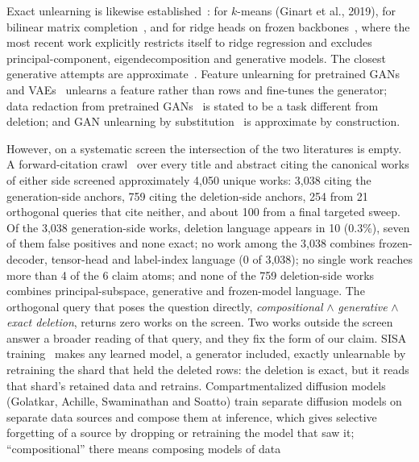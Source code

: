 \documentclass{article} %
\begin{document}
Exact unlearning is likewise established~\citep{nguyen2025survey}: for $k$-means (Ginart et al., 2019\nocite{ginart2019making}), for bilinear
matrix completion~\citep{xu2023netflix}, and for ridge heads on frozen backbones~\citep{quan2026exact}, where the most recent work
explicitly restricts itself to ridge regression and excludes principal-component,
eigendecomposition and generative models. The closest generative attempts are approximate~\citep{kong2022approximate}.
Feature unlearning for pretrained GANs and VAEs~\citep{moon2024feature} unlearns a feature rather than rows and
fine-tunes the generator; data redaction from pretrained GANs~\citep{kong2023data} is stated to be a task different
from deletion; and GAN unlearning by substitution~\citep{sun2025generative} is approximate by construction.

However, on a systematic screen the intersection of the two literatures is empty. A
forward-citation crawl~\citep{priem2022openalex} over every title and abstract citing the canonical works of either side
screened approximately 4,050 unique works: 3,038 citing the generation-side anchors, 759 citing
the deletion-side anchors, 254 from 21 orthogonal queries that cite neither, and about 100 from
a final targeted sweep. %
Of the 3,038 generation-side works, deletion language appears in 10 (0.3\%), seven of them
false positives and none exact; no work among the 3,038 combines frozen-decoder, tensor-head
and label-index language (0 of 3,038); no single work reaches more than 4 of the 6 claim atoms;
and none of the 759 deletion-side works combines principal-subspace, generative and
frozen-model language. %
The orthogonal query that poses the question directly, \emph{compositional} $\wedge$
\emph{generative} $\wedge$ \emph{exact deletion}, returns zero works on the screen.
Two works outside the screen answer a broader reading of that query, and they fix the form of
our claim. SISA training~\citep{bourtoule2021machine} makes any learned model, a generator
included, exactly unlearnable by retraining the shard that held the deleted rows: the deletion is
exact, but it reads that shard's retained data and retrains. Compartmentalized diffusion models
(Golatkar, Achille, Swaminathan and Soatto) train separate diffusion models on separate data
sources and compose them at inference, which gives selective forgetting of a source by dropping
or retraining the model that saw it; ``compositional'' there means composing models of data
\end{document}
